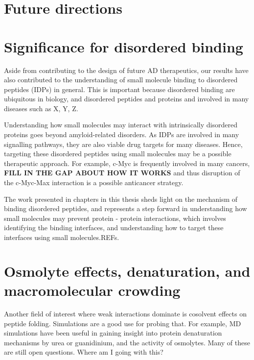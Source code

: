 \section{Future directions}
\section{Significance for disordered binding}
Aside from contributing to the design of future AD therapeutics, our results have also contributed to the understanding of small molecule binding to disordered peptides (IDPs) in general. This is important because disordered binding are ubiquitous in biology, and disordered peptides and proteins and involved in many diseases such as X, Y, Z.  

Understanding how small molecules may interact with intrinsically disordered proteins goes beyond amyloid-related disorders. As IDPs are involved in many signalling pathways, they are also viable drug targets for many diseases.   Hence, targeting these disordered peptides using small molecules may be a possible therapeutic approach. For example, c-Myc is frequently involved in many cancers, \textbf{FILL IN THE GAP ABOUT HOW IT WORKS} and thus disruption of the c-Myc-Max interaction is a possible anticancer strategy.\cite{Iakoucheva:2002uv,Metallo:2010p6822,Cuchillo:2012bm}

The work presented in chapters in this thesis sheds light on the mechanism of binding disordered peptides, and represents a step forward in understanding how small molecules may prevent protein - protein interactions, which involves identifying the binding interfaces, and understanding how to target these interfaces using small molecules.REFs.

\section{Osmolyte effects, denaturation, and macromolecular crowding}
Another field of interest where weak interactions dominate is cosolvent effects on peptide folding. Simulations are a good use for probing that.  For example, MD simulations have been useful in gaining insight into protein denaturation mechanisms by urea or guanidinium, and the activity of osmolytes. Many of these are still open questions.\cite{http://pubs.acs.org/doi/abs/10.1021/jp200625k -- crowding and protein association.} Where am I going with this?

